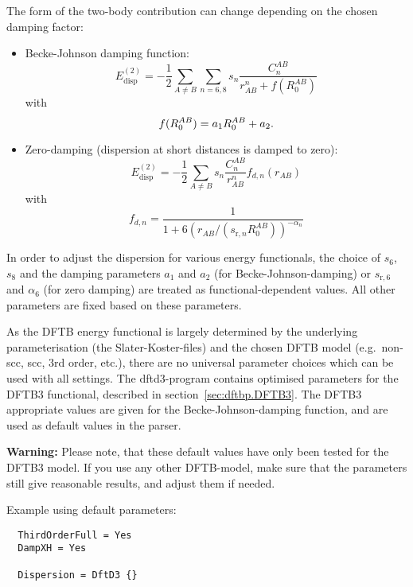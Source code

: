 The form of the two-body contribution can change depending on the chosen damping
factor:
\begin{itemize}
\item Becke-Johnson damping function:
  \begin{equation*}
    E_{\text{disp}}^{(2)} = -\frac{1}{2} \sum_{A\neq B} \sum_{n=6,8} s_n
    \frac{C_n^{AB}}{r_{AB}^n + f(R_0^{AB})}
  \end{equation*}
  with
  \begin{equation*}
    f(R_0^{AB}) = a_1 R_0^{AB} + a_2 \text.
  \end{equation*}

\item Zero-damping (dispersion at short distances is damped to zero):
  \begin{equation*}
    E_{\text{disp}}^{(2)} = -\frac{1}{2} \sum_{A \neq B} s_n
    \frac{C_n^{AB}}{r_{AB}^n} f_{d,n}(r_{AB})
  \end{equation*}
  with
  \begin{equation*}
    f_{d,n} = \frac{1}{1 + 6(r_{AB}/(s_{\text{r},n} R_0^{AB}))^{-\alpha_n}}
  \end{equation*}
\end{itemize}

In order to adjust the dispersion for various energy functionals, the choice of
$s_6$, $s_8$ and the damping parameters $a_1$ and $a_2$ (for
Becke-Johnson-damping) or $s_{\text{r},6}$ and $\alpha_6$ (for zero damping) are
treated as functional-dependent values. All other parameters are fixed based on
these parameters.

As the DFTB energy functional is largely determined by the underlying
parameterisation (the Slater-Koster-files) and the chosen DFTB model
(e.g.\ non-scc, scc, 3rd order, etc.), there are no universal parameter choices
which can be used with all settings. The dftd3-program contains optimised
parameters for the DFTB3 functional, described in section~\ref{sec:dftbp.DFTB3}. The DFTB3
appropriate values are given for the Becke-Johnson-damping function, and are
used as default values in the \dftbp{} parser.

\textbf{Warning:} Please note, that these default values have only been tested for the DFTB3
model. If you use any other DFTB-model, make sure that the parameters still give reasonable results,
and adjust them if needed.

Example using default parameters:
\begin{verbatim}
  ThirdOrderFull = Yes
  DampXH = Yes

  Dispersion = DftD3 {}
\end{verbatim}

